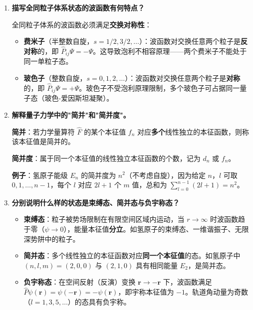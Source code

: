 \begin{enumerate}[label=\textbf{\arabic*.}, leftmargin=2em, itemsep=0.8em]
\item \textbf{描写全同粒子体系状态的波函数有何特点？}

全同粒子体系的波函数必须满足\textbf{交换对称性}：
\begin{itemize}[nosep]
    \item \textbf{费米子}（半整数自旋，$s=1/2,3/2,\dots$）：波函数对交换任意两个粒子是\textbf{反对称}的，即 $\hat{P}_{ij}\Psi = -\Psi$。这导致泡利不相容原理——两个费米子不能处于同一单粒子态。
    \item \textbf{玻色子}（整数自旋，$s=0,1,2,\dots$）：波函数对交换任意两个粒子是\textbf{对称}的，即 $\hat{P}_{ij}\Psi = +\Psi$。玻色子不受泡利原理限制，多个玻色子可占据同一量子态（玻色-爱因斯坦凝聚）。
\end{itemize}

\item \textbf{解释量子力学中的"简并"和"简并度"。}

\textbf{简并}：若力学量算符 $\hat{F}$ 的某个本征值 $f_n$ 对应\textbf{多个}线性独立的本征函数，则称该本征值是简并的。

\textbf{简并度}：属于同一个本征值的线性独立本征函数的个数，记为 $d_n$ 或 $f_n$。

\textbf{例子}：氢原子能级 $E_n$ 的简并度为 $n^2$（不考虑自旋），因为给定 $n$，$l$ 可取 $0,1,\dots,n-1$，每个 $l$ 对应 $2l+1$ 个 $m$ 值，总和为 $\sum_{l=0}^{n-1}(2l+1)=n^2$。

\item \textbf{分别说明什么样的状态是束缚态、简并态与负宇称态？}

\begin{itemize}[nosep]
    \item \textbf{束缚态}：粒子被势场限制在有限空间区域内运动，当 $r\to\infty$ 时波函数趋于零（$\psi\to 0$），能量本征值\textbf{分立}。如氢原子的束缚态、一维谐振子、无限深势阱中的粒子。
    \item \textbf{简并态}：多个线性独立的本征函数对应\textbf{同一个本征值}的态。如氢原子中 $(n,l,m)=(2,0,0)$ 与 $(2,1,0)$ 具有相同能量 $E_2$，是简并态。
    \item \textbf{负宇称态}：在空间反射（反演）变换 $\mathbf{r}\to -\mathbf{r}$ 下，波函数满足 $\hat{P}\psi(\mathbf{r}) = \psi(-\mathbf{r}) = -\psi(\mathbf{r})$，即宇称本征值为 $-1$。轨道角动量为奇数（$l=1,3,5,\dots$）的态具有负宇称。
\end{itemize}


\end{enumerate}
